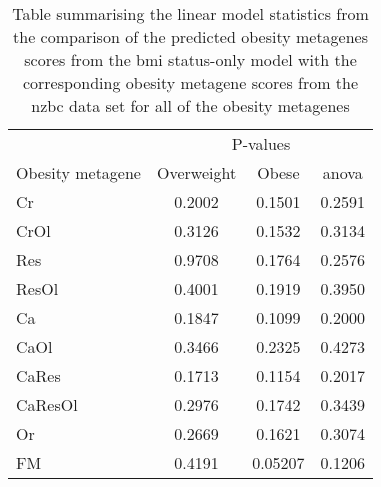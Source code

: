 \begin{appendices}
	\begin{table}[htpb]
		\centering
		\caption[Summary of the statistics from the comparison of all the predicted obesity metagene scores from the \gls{bmi} status-only model with the corresponding obesity metagenes from the \gls{nzbc} data]{Table summarising the linear model statistics from the comparison of the predicted obesity metagenes scores from the \gls{bmi} status-only model with the corresponding obesity metagene scores from the \gls{nzbc} data set for all of the obesity metagenes}
		\label{tab:bmi_status_cris}
		\begin{tabular}{lccc}
			& \multicolumn{3}{c}{ P-values} \\
			\cmidrule(r){2-4}
			Obesity metagene & Overweight & Obese & \gls{anova} \\
			\hline
			\hline
			\rule{0pt}{2.25ex}Cr & 0.2002 & 0.1501  & 0.2591 \\
			CrOl                 & 0.3126 & 0.1532  & 0.3134 \\
			Res                  & 0.9708 & 0.1764  & 0.2576 \\
			ResOl                & 0.4001 & 0.1919  & 0.3950 \\
			Ca                   & 0.1847 & 0.1099  & 0.2000 \\
			CaOl                 & 0.3466 & 0.2325  & 0.4273 \\
			CaRes                & 0.1713 & 0.1154  & 0.2017 \\
			CaResOl              & 0.2976 & 0.1742  & 0.3439 \\
			Or                   & 0.2669 & 0.1621  & 0.3074 \\
			FM                   & 0.4191 & 0.05207 & 0.1206 \\
			\hline
			\hline
		\end{tabular}
	\end{table}



\end{appendices}

